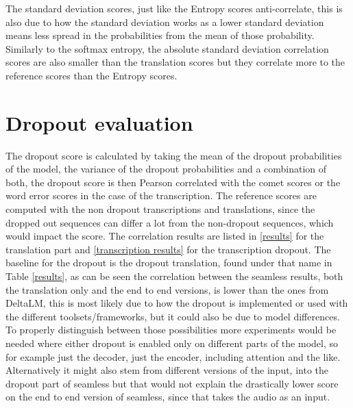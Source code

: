 The standard deviation scores, just like the Entropy scores anti-correlate, this is also due to how the standard deviation works as a lower standard deviation means less spread in the probabilities from the mean of those probability. 
Similarly to the softmax entropy, the absolute standard deviation correlation scores are also smaller than the translation scores but they correlate more to the reference scores than the Entropy scores. 

\section{Dropout evaluation}
The dropout score is calculated by taking the mean of the dropout probabilities of the model, the variance of the dropout probabilities and a combination of both, the dropout score is then Pearson correlated with the comet scores or the word error scores in the case of the transcription. 
The reference scores are computed with the non dropout transcriptions and translations, since the dropped out sequences can differ a lot from the non-dropout sequences, which would impact the score. 
The correlation results are listed in \autoref{results} for the translation part and \autoref{transcription results} for the transcription dropout. 
The baseline for the dropout is the dropout translation, found under that name in Table \autoref{results}, as can be seen the correlation between the seamless results, both the translation only and the end to end versions, is lower than the ones from DeltaLM, this is most likely due to how the dropout is implemented or used with the different toolsets/frameworks, but it could also be due to model differences. To properly distinguish between those possibilities more experiments would be needed where either dropout is enabled only on different parts of the model, so for example just the decoder, just the encoder, including attention and the like. Alternatively it might also stem from different versions of the input, into the dropout part of seamless but that would not explain the drastically lower score on the end to end version of seamless, since that takes the audio as an input. 



